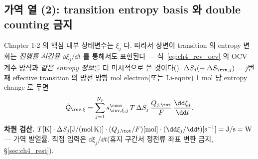 \subsection{가역 열 (2): transition entropy basis 와 double counting 금지}\label{sec:ch4_revxi}
Chapter 1$\cdot$2 의 핵심 내부 상태변수는 $\xi_j$ 다. 따라서 상변이 transition 의 entropy 변화는 \emph{진행률
시간율} $\dd\xi_j/\dd t$ 를 통해서도 표현된다 — 식~\eqref{eq:ch4_rev_ocv} 의 OCV 계수 방식과 \emph{같은 entropy
정보}를 더 미시적으로 쓴 것이다(). $\Delta S_j(\equiv\Delta S_{\rxn,j})$ = $j$번째 effective transition
의 방전 방향 mol electron(또는 Li-equiv) 1 mol 당 entropy change 로 두면
\begin{equation}
\dot{\mathcal Q}_{\rev,\xi}=\sum_{j=1}^{N_p}s_{\rev,\xi,j}^{\conv}\,T\,\Delta S_j\,\frac{Q_{j,\tot}}{F}\,\frac{\dd\xi_j}{\dd t}.
\label{eq:ch4_rev_xi}
\end{equation}
\textbf{차원 검산.} $T[\mathrm K]\cdot\Delta S_j[\mathrm{J/(mol\,K)}]\cdot(Q_{j,\tot}/F)[\mathrm{mol}]\cdot
(\dd\xi_j/\dd t)[\mathrm{s^{-1}}]=\mathrm{J/s}=\mathrm W$ — 가역 발열률. 직접 입력은 $\dd\xi_j/\dd t$(휴지 구간서
정전류 좌표 변환 금지, \S\ref{sec:ch4_rest}).

